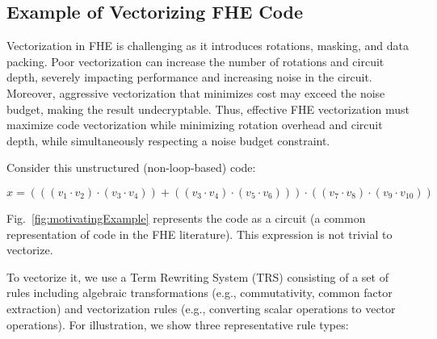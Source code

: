 \subsection{Example of Vectorizing FHE Code \label{sec:motivatingexample} }


Vectorization in FHE is challenging as it introduces rotations, masking, and data packing. Poor vectorization can increase the number of rotations and circuit depth, severely impacting performance and increasing noise in the circuit. Moreover, aggressive vectorization that minimizes cost may exceed the noise budget, making the result undecryptable. Thus, effective FHE vectorization must maximize code vectorization while minimizing rotation overhead and circuit depth, while simultaneously respecting a noise budget constraint.

Consider this unstructured (non-loop-based) code:

{
\shrink[1.5]
\CodeSize
\begin{equation}
x =  ( ((v_1 \cdot v_2) \cdot (v_3 \cdot v_4)) + ((v_3 \cdot v_4) \cdot (v_5 \cdot v_6)) )\cdot ((v_7 \cdot v_8) \cdot (v_9 \cdot v_{10}))
\label{eq:example}
\tag{1}
\end{equation}
\shrink[1.5]
}

Fig.~\ref{fig:motivatingExample} represents the code as a circuit (a common representation of code in the FHE literature). This expression is not trivial to vectorize.

To vectorize it, we use a Term Rewriting System (TRS) consisting of a set of rules including algebraic transformations (e.g., commutativity, common factor extraction) and vectorization rules (e.g., converting scalar operations to vector operations). For illustration, we show three representative rule types:

